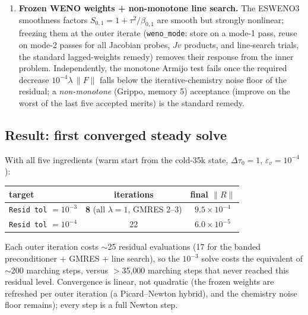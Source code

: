 \documentclass[english,a4paper]{my_memo}
\newcommand{\code}[1]{\texttt{#1}}
\begin{document}
\begin{enumerate}
  $\max(v_1,0)$, and the steady state hugs the kink
  ($v_1\simeq+4.5\times10^{-3}c_s$): Newton trial steps crossing $v_1=0$
  are non-differentiable. Opt-in replacement (\code{Valve eps:}):
  $v_g=\tfrac12\big(v+\sqrt{v^2+\varepsilon_v^2}\big)$, smooth, $\to0$ for
  $v\ll-\varepsilon_v$, $\to v$ for $v\gg\varepsilon_v$ (an earlier
  variant with a $-\varepsilon_v/2$ shift leaked inflow and was fixed).
  With $\varepsilon_v=10^{-2}$ (too large, it perturbs the state) the
  solver descends $10\times$ \emph{through} the base (differentiability
  is what Newton needed), but $\varepsilon_v=10^{-4}$ still stalled at
  the base: the valve was not the only kink.
\item \textbf{Frozen WENO weights + non-monotone line search.} The ESWENO3
  smoothness factors $S_{0,1}=1+\tau^2/\beta_{0,1}$ are smooth but
  strongly nonlinear; freezing them at the outer iterate
  (\code{weno\_mode}: store on a mode-1 pass, reuse on mode-2 passes for
  all Jacobian probes, $Jv$ products, and line-search trials, the
  standard lagged-weights remedy) removes their response from the inner
  problem. Independently, the monotone Armijo test fails once the required
  decrease $10^{-4}\lambda\,\|F\|$ falls below the iterative-chemistry
  noise floor of the residual; a \emph{non-monotone} (Grippo, memory 5)
  acceptance (improve on the worst of the last five accepted merits)
  is the standard remedy.
\end{enumerate}

\subsection{Result: first converged steady solve}\label{sec:converged}

With all five ingredients (warm start from the cold-35k state,
$\Delta\tau_0=1$, $\varepsilon_v=10^{-4}$):

\begin{center}
\begin{tabular}{lcc}
\toprule
target & iterations & final $\|R\|$ \\
\midrule
\code{Resid tol} $=10^{-3}$ & \textbf{8} (all $\lambda=1$, GMRES 2--3) &
 $9.5\times10^{-4}$\\
\code{Resid tol} $=10^{-4}$ & 22 & $6.0\times10^{-5}$\\
\bottomrule
\end{tabular}
\end{center}

Each outer iteration costs $\sim$25 residual evaluations (17 for the
banded preconditioner + GMRES + line search), so the $10^{-3}$ solve costs
the equivalent of $\sim$200 marching steps, versus $>$35{,}000 marching
steps that never reached this residual level. Convergence is linear, not
quadratic (the frozen weights are refreshed per outer iteration (a
Picard--Newton hybrid), and the chemistry noise floor remains); every
step is a full Newton step.
\end{document}
